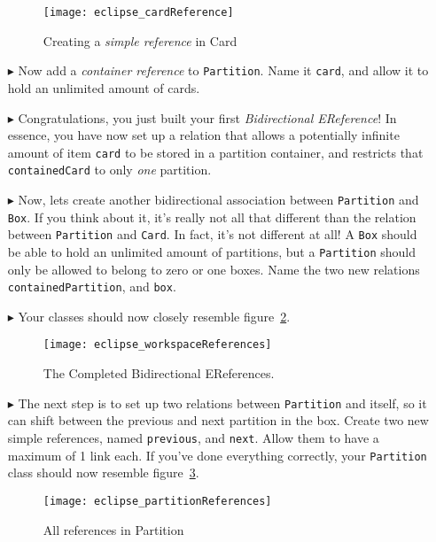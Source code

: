\begin{itemize}
\begin{figure}[htbp]
	\centering
  \texttt{[image: eclipse\_cardReference]}
	\caption{Creating a \emph{simple reference} in Card}
	\label{fig:cardReference}
\end{figure} 

\item[$\blacktriangleright$] Now add a \emph{container reference} to \texttt{Partition}. Name it \texttt{card}, and allow it to hold an unlimited amount of cards.

\item[$\blacktriangleright$] Congratulations, you just built your first \emph{Bidirectional EReference}! In essence, you have now set up a relation that allows a potentially infinite amount of item \texttt{card} to be stored in a partition container, and restricts that \texttt{containedCard} to only \emph{one} partition.

\item[$\blacktriangleright$] Now, lets create another bidirectional association between \texttt{Partition} and \texttt{Box}. If you think about it, it's really not all that different than the relation between \texttt{Partition} and \texttt{Card}. In fact, it's not different at all! A \texttt{Box} should be able to hold an unlimited amount of partitions, but a \texttt{Partition} should only be allowed to belong to zero or one boxes. Name the two new relations \texttt{containedPartition}, and \texttt{box}. 

\item[$\blacktriangleright$] Your classes should now closely resemble figure~\ref{fig:allReferences}.


\begin{figure}[htbp]
	\centering
  \texttt{[image: eclipse\_workspaceReferences]}
	\caption{The Completed Bidirectional EReferences.}
	\label{fig:allReferences}
\end{figure} 


\item[$\blacktriangleright$] The next step is to set up two relations between \texttt{Partition} and itself, so it can shift between the previous and next partition in the box. Create two new simple references, named \texttt{previous}, and \texttt{next}. Allow them to have a maximum of 1 link each. If you've done everything correctly, your \texttt{Partition} class should now resemble figure~\ref{fig:partitionReferences}.

\begin{figure}[htbp]
	\centering
  \texttt{[image: eclipse\_partitionReferences]}
	\caption{All references in Partition}
	\label{fig:partitionReferences}
\end{figure} 


\end{itemize}
